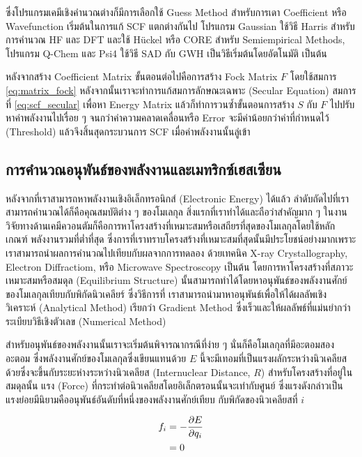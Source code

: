ซึ่งโปรแกรมเคมีเชิงคำนวณต่างก็มีการเลือกใช้ Guess Method สำหรับการเดา Coefficient หรือ Wavefunction เริ่มต้นในการแก้ SCF แตกต่างกันไป
โปรแกรม Gaussian ใช้วิธี Harris สำหรับการคำนวณ HF และ DFT และใช้ H{\"u}ckel หรือ CORE สำหรับ Semiempirical Methods, 
โปรแกรม Q-Chem และ Psi4 ใช้วิธี SAD กับ GWH เป็นวิธีเริ่มต้นโดยอัตโนมัติ เป็นต้น

หลังจากสร้าง Coefficient Matrix ขั้นตอนต่อไปคือการสร้าง Fock Matrix $F$ โดยใช้สมการ \ref{eq:matrix_fock} 
หลังจากนั้นเราจะทำการแก้สมการลักษณะเฉพาะ (Secular Equation) สมการที่ \ref{eq:scf_secular} เพื่อหา Energy Matrix 
แล้วก็ทำการวนซ้ำขั้นตอนการสร้าง $S$ กับ $F$ ไปปรับหาค่าพลังงานไปเรื่อย ๆ จนกว่าค่าความคลาดเคลื่อนหรือ Error จะมีค่าน้อยกว่าค่าที่กำหนดไว้ 
(Threshold) แล้วจึงสิ้นสุดกระบวนการ SCF เมื่อค่าพลังงานนั้นลู่เข้า

\subsection{การคำนวณอนุพันธ์ของพลังงานและเมทริกซ์เฮสเซียน}
\label{ssec:ener_der}

หลังจากที่เราสามารถหาพลังงานเชิงอิเล็กทรอนิกส์ (Electronic Energy) ได้แล้ว ลำดับถัดไปที่เราสามารถคำนวณได้ก็คือคุณสมบัติต่าง ๆ ของโมเลกุล
สิ่งแรกที่เราทำได้และถือว่าสำคัญมาก ๆ ในงานวิจัยทางด้านเคมีควอนตัมก็คือการหาโครงสร้างที่เหมาะสมหรือเสถียรที่สุดของโมเลกุลโดยใช้หลักเกณฑ์%
พลังงานรวมที่ต่ำที่สุด ซึ่งการที่เราทราบโครงสร้างที่เหมาะสมที่สุดนั้นมีประโยชน์อย่างมากเพราะเราสามารถนำผลการคำนวณไปเทียบกับผลจากการทดลอง%
ด้วยเทคนิค X-ray Crystallography, Electron Diffractiom, หรือ Microwave Spectroscopy เป็นต้น โดยการหาโครงสร้างที่สภาวะ%
เหมาะสมหรือสมดุล (Equilibrium Structure) นั้นสามารถทำได้โดยหาอนุพันธ์ของพลังงานศักย์ของโมเลกุลเทียบกับพิกัดนิวเคลียร์ ซึ่งวิธีการที่%
เราสามารถนำมาหาอนุพันธ์เพื่อให้ได้ผลลัพเชิงวิเคราะห์ (Analytical Method) เรียกว่า Gradient Method ซึ่งเร็วและให้ผลลัพธ์ที่แม่นยำกว่า%
ระเบียบวิธีเชิงตัวเลข (Numerical Method)

สำหรับอนุพันธ์ของพลังงานนั้นเราจะเริ่มต้นพิจารณากรณีที่ง่าย ๆ นั่นก็คือโมเลกุลที่มีอะตอมสองอะตอม ซึ่งพลังงานศักย์ของโมเลกุลซึ่งเขียนแทนด้วย $E$ 
นี้จะมีเทอมที่เป็นแรงผลักระหว่างนิวเคลียสด้วยซึ่งจะขึ้นกับระยะห่างระหว่างนิวเคลียส (Internuclear Distance, $R$) สำหรับโครงสร้างที่อยู่ในสมดุลนั้น 
แรง (Force) ที่กระทำต่อนิวเคลียสโดยอิเล็กตรอนนั้นจะเท่ากับศูนย์ ซึ่งแรงดังกล่าวเป็นแรงย่อยมีนิยามคืออนุพันธ์อันดับที่หนึ่งของพลังงานศักย์เทียบ%
กับพิกัดของนิวเคลียสที่ $i$

\begin{align}
    f_{i} &= - \pdv{E}{q_{i}} \\
    &= 0
\end{align}

